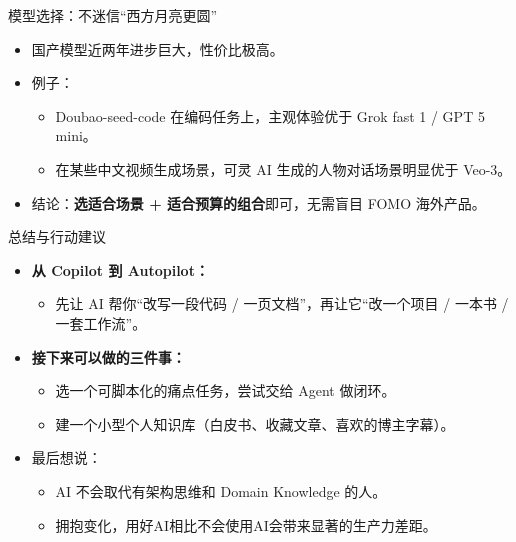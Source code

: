 \documentclass[10pt,aspectratio=169]{beamer}
\begin{document}
\begin{frame}{模型选择：不迷信“西方月亮更圆”}
  \begin{itemize}
    \item 国产模型近两年进步巨大，性价比极高。
    \item 例子：
      \begin{itemize}
        \item Doubao-seed-code 在编码任务上，主观体验优于 Grok fast 1 / GPT 5 mini。
        \item 在某些中文视频生成场景，可灵 AI 生成的人物对话场景明显优于 Veo-3。
      \end{itemize}
    \item 结论：\textbf{选适合场景 + 适合预算的组合}即可，无需盲目 FOMO 海外产品。
  \end{itemize}
\end{frame}

\begin{frame}{总结与行动建议}
  \begin{itemize}
    \item \textbf{从 Copilot 到 Autopilot：}
      \begin{itemize}
        \item 先让 AI 帮你“改写一段代码 / 一页文档”，再让它“改一个项目 / 一本书 / 一套工作流”。
      \end{itemize}
    \item \textbf{接下来可以做的三件事：}
      \begin{itemize}
        \item 选一个可脚本化的痛点任务，尝试交给 Agent 做闭环。
        \item 建一个小型个人知识库（白皮书、收藏文章、喜欢的博主字幕）。
      \end{itemize}
    \item 最后想说：
      \begin{itemize}
        \item AI 不会取代有架构思维和 Domain Knowledge 的人。
        \item 拥抱变化，用好AI相比不会使用AI会带来显著的生产力差距。
      \end{itemize}
  \end{itemize}
\end{frame}
\end{document}

